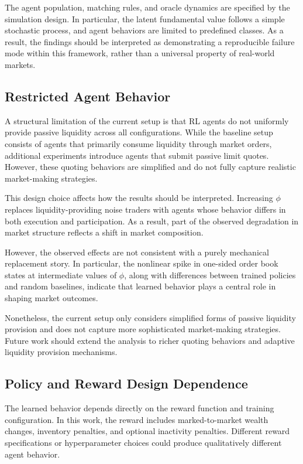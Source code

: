 \documentclass[sigconf]{acmart}
\begin{document}
The agent population, matching rules, and oracle dynamics are specified by the simulation design. In particular, the latent fundamental value follows a simple stochastic process, and agent behaviors are limited to predefined classes. As a result, the findings should be interpreted as demonstrating a reproducible failure mode within this framework, rather than a universal property of real-world markets.

\subsection{Restricted Agent Behavior}

A structural limitation of the current setup is that RL agents do not uniformly provide passive liquidity across all configurations. While the baseline setup consists of agents that primarily consume liquidity through market orders, additional experiments introduce agents that submit passive limit quotes. However, these quoting behaviors are simplified and do not fully capture realistic market-making strategies.

This design choice affects how the results should be interpreted. Increasing $\phi$ replaces liquidity-providing noise traders with agents whose behavior differs in both execution and participation. As a result, part of the observed degradation in market structure reflects a shift in market composition.

However, the observed effects are not consistent with a purely mechanical replacement story. In particular, the nonlinear spike in one-sided order book states at intermediate values of $\phi$, along with differences between trained policies and random baselines, indicate that learned behavior plays a central role in shaping market outcomes.

Nonetheless, the current setup only considers simplified forms of passive liquidity provision and does not capture more sophisticated market-making strategies. Future work should extend the analysis to richer quoting behaviors and adaptive liquidity provision mechanisms.

\subsection{Policy and Reward Design Dependence}

The learned behavior depends directly on the reward function and training configuration. In this work, the reward includes marked-to-market wealth changes, inventory penalties, and optional inactivity penalties. Different reward specifications or hyperparameter choices could produce qualitatively different agent behavior.
\end{document}
